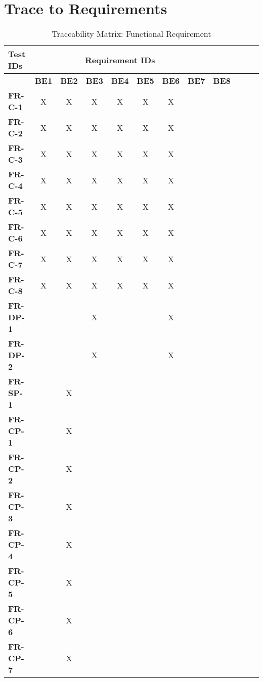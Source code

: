 \documentclass[12pt, titlepage]{article}
\begin{document}
\section{Trace to Requirements}
\begin{table}[H]
    \centering
    \caption{Traceability Matrix: Functional Requirement}
    \begin{adjustbox}{max width=0.7\paperwidth}
    \begin{tabular}{l|ccccccccccc}
        \textbf{Test IDs} & \multicolumn{7}{c}{\textbf{Requirement IDs}}\\
        \hline
        ~ & \textbf{BE1} & \textbf{BE2} & \textbf{BE3} & \textbf{BE4} & \textbf{BE5} & \textbf{BE6} & \textbf{BE7} & \textbf{BE8}\\
        \textbf{FR-C-1}    & X & X & X & X & X & X & ~ & ~\\
        \textbf{FR-C-2}    & X & X & X & X & X & X & ~ & ~\\
        \textbf{FR-C-3}    & X & X & X & X & X & X & ~ & ~\\
        \textbf{FR-C-4}    & X & X & X & X & X & X & ~ & ~\\
        \textbf{FR-C-5}    & X & X & X & X & X & X & ~ & ~\\
        \textbf{FR-C-6}    & X & X & X & X & X & X & ~ & ~\\
        \textbf{FR-C-7}    & X & X & X & X & X & X & ~ & ~\\
        \textbf{FR-C-8}    & X & X & X & X & X & X & ~ & ~\\
        \textbf{FR-DP-1}   & ~ & ~ & X & ~ & ~ & X & ~ & ~\\
        \textbf{FR-DP-2}   & ~ & ~ & X & ~ & ~ & X & ~ & ~\\
        \textbf{FR-SP-1}   & ~ & X & ~ & ~ & ~ & ~ & ~ & ~\\
        \textbf{FR-CP-1}   & ~ & X & ~ & ~ & ~ & ~ & ~ & ~\\
        \textbf{FR-CP-2}   & ~ & X & ~ & ~ & ~ & ~ & ~ & ~\\
        \textbf{FR-CP-3}   & ~ & X & ~ & ~ & ~ & ~ & ~ & ~\\
        \textbf{FR-CP-4}   & ~ & X & ~ & ~ & ~ & ~ & ~ & ~\\
        \textbf{FR-CP-5}   & ~ & X & ~ & ~ & ~ & ~ & ~ & ~\\
        \textbf{FR-CP-6}   & ~ & X & ~ & ~ & ~ & ~ & ~ & ~\\
        \textbf{FR-CP-7}   & ~ & X & ~ & ~ & ~ & ~ & ~ & ~\\

\end{tabular}
\end{adjustbox}
\end{table}
\end{document}
